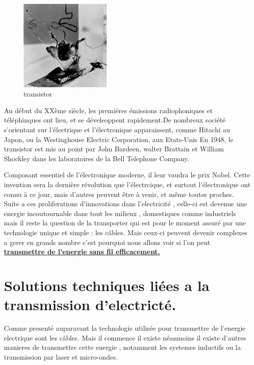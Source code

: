 \documentclass[12pt]{report}
\begin{document}
\begin{figure}
  \begin{center}
    \includegraphics[width=0.4\textwidth]{transistor}
  \end{center}
  \caption{transistor}
\end{figure} Au début du XXème siècle, les premières émissions radiophoniques et téléphinques ont lieu, et se déveleoppent rapidement.De nombreux société s'orientant sur l'électrique et l'électronique apparaissent, comme Hitachi au Japon, ou la Westinghouse Electric Corporation, aux Etats-Unis
En 1948, le transistor est mis au point par John Bardeen, walter Brattain et William Shockley dans les laboratoires de la Bell Telephone Company. 

Composant essentiel de l'électronique moderne, il leur vaudra le prix Nobel.
Cette invention sera la dernière révolution que l'électrcique, et surtout l'électronique ont connu à ce jour, mais d'autres peuvent être à venir, et même toutes proches. Suite a ces proliferations d'innovations dans l'electricité , celle-ci est devenue une energie incoutournable dans tout les milieux , domestiques comme industriels mais il reste la question de la transporter qui est pour le moment assuré par une technologie unique et simple : les câbles. Mais ceux-ci peuvent devenir complexes a gerer en grands nombre c'est pourquoi nous allons voir si l'on peut \textbf{\underline{transmettre de l'energie sans fil efficacement.}}

\chapter{Solutions techniques liées a la transmission d'electricté.}
  Comme presenté auparavant la technologie utilisée pour transmettre de l'energie electrique sont les câbles. Mais il commence il existe néanmoins il existe d'autres manieres de transmettre cette energie , notamment les systemes inductifs ou la transmission par laser et micro-ondes.
\end{document}
